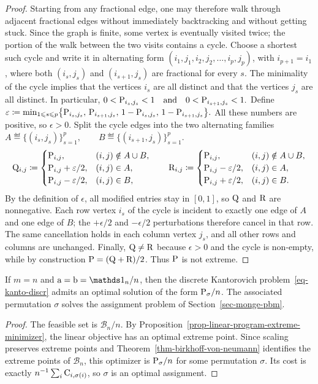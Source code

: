 \begin{proof}
Starting from any fractional edge, one may therefore walk through adjacent fractional edges without immediately backtracking and without getting stuck. Since the graph is finite, some vertex is eventually visited twice; the portion of the walk between the two visits contains a cycle. Choose a shortest such cycle and write it in alternating form $(i_1,j_1,i_2,j_2,\ldots,i_p,j_p)$, with $i_{p+1}=i_1$, where both $(i_s,j_s)$ and $(i_{s+1},j_s)$ are fractional for every $s$. The minimality of the cycle implies that the vertices $i_s$ are all distinct and that the vertices $j_s$ are all distinct. In particular,
\(0<\P_{i_s,j_s}<1 \qandq 0<\P_{i_{s+1},j_s}<1.\)
Define
\(\epsilon \eqdef \min_{1\leq s\leq p} \bigl\{ \P_{i_s,j_s},\, \P_{i_{s+1},j_s},\, 1-\P_{i_s,j_s},\, 1-\P_{i_{s+1},j_s} \bigr\}.\)
All these numbers are positive, so $\epsilon>0$. Split the cycle edges into the two alternating families
\(A\eqdef \{(i_s,j_s)\}_{s=1}^p, \qquad B\eqdef \{(i_{s+1},j_s)\}_{s=1}^p.\)
\[
\Q_{i,j}\eqdef
\begin{cases}
\P_{i,j}, & (i,j)\notin A\cup B,\\
\P_{i,j}+\epsilon/2, & (i,j)\in A,\\
\P_{i,j}-\epsilon/2, & (i,j)\in B,
\end{cases}
\qquad
\R_{i,j}\eqdef
\begin{cases}
\P_{i,j}, & (i,j)\notin A\cup B,\\
\P_{i,j}-\epsilon/2, & (i,j)\in A,\\
\P_{i,j}+\epsilon/2, & (i,j)\in B.
\end{cases}
\]
By the definition of $\epsilon$, all modified entries stay in $[0,1]$, so $\Q$ and $\R$ are nonnegative. Each row vertex $i_s$ of the cycle is incident to exactly one edge of $A$ and one edge of $B$; the $+\epsilon/2$ and $-\epsilon/2$ perturbations therefore cancel in that row. The same cancellation holds in each column vertex $j_s$, and all other rows and columns are unchanged. Finally, $\Q\neq \R$ because $\epsilon>0$ and the cycle is non-empty, while by construction $\P=(\Q+\R)/2$. Thus $\P$ is not extreme.
\end{proof}
\begin{cor}\label{cor-kantorovich-matching}
If $m=n$ and $\a=\b=\ones_n/n$, then the discrete Kantorovich problem~\eqref{eq-kanto-discr} admits an optimal solution of the form $\P_\sigma/n$. The associated permutation $\sigma$ solves the assignment problem of Section~\ref{sec-monge-pbm}.
\end{cor}
\begin{proof}
The feasible set is $\mathcal B_n/n$. By Proposition~\ref{prop-linear-program-extreme-minimizer}, the linear objective has an optimal extreme point. Since scaling preserves extreme points and Theorem~\ref{thm-birkhoff-von-neumann} identifies the extreme points of $\mathcal B_n$, this optimizer is $\P_\sigma/n$ for some permutation $\sigma$. Its cost is exactly $n^{-1}\sum_i \C_{i,\sigma(i)}$, so $\sigma$ is an optimal assignment.
\end{proof}
